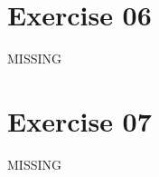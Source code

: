 \documentclass[11pt,a4paper]{scrartcl}
\begin{document}
\section*{Exercise 06}
MISSING

\section*{Exercise 07}
MISSING
\end{document}
